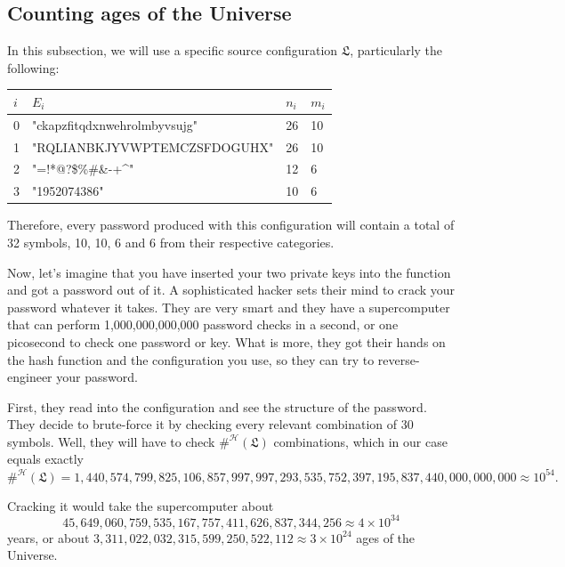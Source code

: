 \documentclass[12pt, a4paper]{article}
\renewcommand{\H}{\mathcal{H}}
\newcommand{\conf}{\mathfrak{L}}
\begin{document}
\subsection{Counting ages of the Universe}\label{bignum}

In this subsection, we will use a specific source configuration $ \conf $, particularly the following:

\begin{center}
\def\arraystretch{1.2}
\begin{tabular}{l|l|l|l}\ttfamily
    $ i $ & $ E_i $ & $ n_i $ & $ m_i $\\
    \hline
    0 & \ttfamily"ckapzfitqdxnwehrolmbyvsujg" & 26 & 10\\
    1 & \ttfamily"RQLIANBKJYVWPTEMCZSFDOGUHX" & 26 & 10\\
    2 & \ttfamily"=!*@?\$\%\#\&-+\^{}"        & 12 & 6\\
    3 & \ttfamily"1952074386"                 & 10 & 6\\
\end{tabular}
\end{center}

Therefore, every password produced with this configuration will contain a total of 32 symbols, 10, 10, 6 and 6 from their respective categories.

Now, let's imagine that you have inserted your two private keys into the function and got a password out of it. A sophisticated hacker sets their mind to crack your password whatever it takes. They are very smart and they have a supercomputer that can perform 1,000,000,000,000 password checks in a second, or one picosecond to check one password or key. What is more, they got their hands on the hash function and the configuration you use, so they can try to reverse-engineer your password.

First, they read into the configuration and see the structure of the password. They decide to brute-force it by checking every relevant combination of 30 symbols. Well, they will have to check $ \#^{\H}(\conf) $ combinations, which in our case equals exactly
\[ \#^{\H}(\conf) = 1,440,574,799,825,106,857,997,997,293,535,752,397,195,837,440,000,000,000 \approx 10^{54}. \]

Cracking it would take the supercomputer about \[ 45,649,060,759,535,167,757,411,626,837,344,256 \approx 4 \times 10^{34} \] years, or about $ 3,311,022,032,315,599,250,522,112 \approx 3 \times 10^{24} $ ages of the Universe.\\
\end{document}

